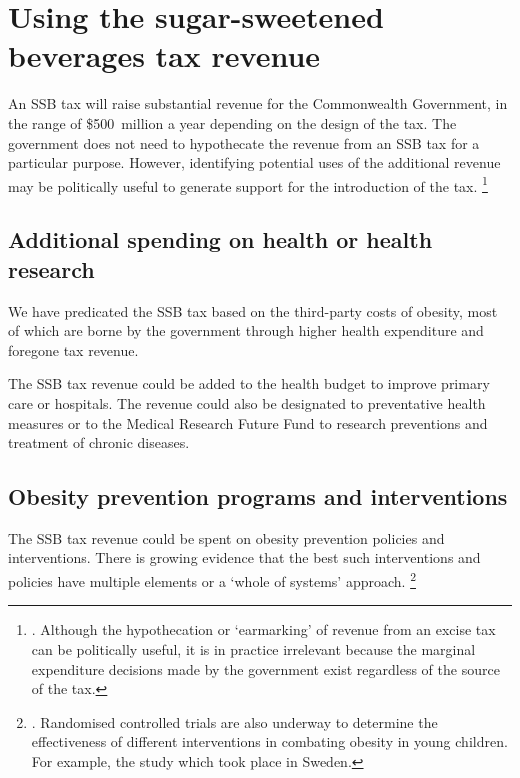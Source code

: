 \documentclass[embargoed]{grattan}
\begin{document}
\chapter{Using the sugar-sweetened beverages tax revenue }\label{using-the-sugar-sweetened-beverages-tax-revenue}

An SSB tax will raise substantial revenue for the Commonwealth Government, in the range of \$500~million a year depending on the design of the tax.
The government does not need to hypothecate the revenue from an SSB tax for a particular purpose.
However, identifying potential uses of the additional revenue may be politically useful to generate support for the introduction of the tax.%
\footnote{\textcites{Freebairn2010Taxationobesity}{Organization2016FiscalPoliciesDiet}{CnossenExcisetaxationAustralia}.
Although the hypothecation or `earmarking' of revenue from an excise tax can be politically useful, it is in practice irrelevant because the marginal expenditure decisions made by the government exist regardless of the source of the tax.}

\section{Additional spending on health or health research}\label{additional-spending-on-health-or-health-research}

We have predicated the SSB tax based on the third-party costs of obesity, most of which are borne by the government through higher health expenditure and foregone tax revenue.

The SSB tax revenue could be added to the health budget to improve primary care or hospitals.
The revenue could also be designated to preventative health measures or to the Medical Research Future Fund to research preventions and treatment of chronic diseases.

\section{Obesity prevention programs and interventions }\label{obesity-prevention-programs-and-interventions}

The SSB tax revenue could be spent on obesity prevention policies and interventions.
There is growing evidence that the best such interventions and policies have multiple elements or a `whole of systems' approach.%
\footnote{\textcites{Ewart-Pierce2016WholeCommunityObesity}{Health2016Insufficientphysicalactivity}{Hawkes2015Smartfoodpolicies}{Organization2016FiscalPoliciesDiet}{Roberto2012Factsfrontversus}{Mckinsey2014overcomingobesity}.
Randomised controlled trials are also underway to determine the effectiveness of different interventions in combating obesity in young children.
For example, the \textcite{Sobko2011randomisedcontrolledtrial} study which took place in Sweden.}
\end{document}
